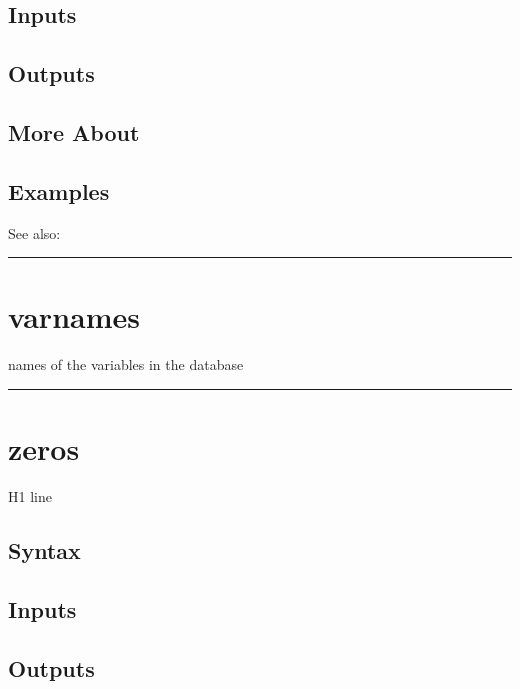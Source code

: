 \documentclass[letterpaper,10pt,english]{sphinxmanual}
\begin{document}
\subsection{Inputs}
\label{classes/time_series/@ts/ts:id605}

\subsection{Outputs}
\label{classes/time_series/@ts/ts:id606}

\subsection{More About}
\label{classes/time_series/@ts/ts:id607}

\subsection{Examples}
\label{classes/time_series/@ts/ts:id608}
See also:


\bigskip\hrule{}\bigskip



\section{varnames}
\label{classes/time_series/@ts/ts:varnames}\label{classes/time_series/@ts/ts:id609}
names of the variables in the database


\bigskip\hrule{}\bigskip



\section{zeros}
\label{classes/time_series/@ts/ts:zeros}\label{classes/time_series/@ts/ts:id610}
H1 line


\subsection{Syntax}
\label{classes/time_series/@ts/ts:id611}

\subsection{Inputs}
\label{classes/time_series/@ts/ts:id612}

\subsection{Outputs}
\label{classes/time_series/@ts/ts:id613}
\end{document}
